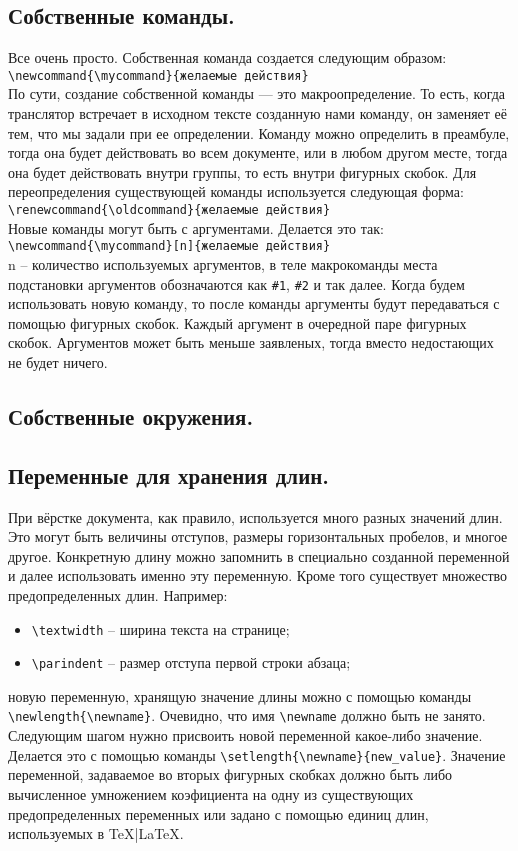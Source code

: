 \subsection{Собственные команды.}
Все очень просто. Собственная команда создается следующим образом:\\
\verb|\newcommand{\mycommand}{желаемые действия}|\\
По сути, создание собственной команды --- это макроопределение. То есть, когда транслятор
встречает в исходном тексте созданную нами команду, он заменяет её тем, что мы задали
при ее определении. Команду можно определить в преамбуле, тогда она будет действовать 
во всем документе, или в любом другом месте, тогда она будет действовать внутри группы, 
то есть внутри фигурных скобок. Для переопределения существующей команды используется
следующая форма:\\
\verb|\renewcommand{\oldcommand}{желаемые действия}|\\
Новые команды могут быть с аргументами. Делается это так:\\
\verb|\newcommand{\mycommand}[n]{желаемые действия}|\\
n -- количество используемых аргументов, в теле макрокоманды места подстановки аргументов
обозначаются как \verb|#1|, \verb|#2| и так далее. Когда будем использовать новую команду,
то после команды аргументы будут передаваться с помощью фигурных скобок. Каждый аргумент
в очередной паре фигурных скобок. Аргументов может быть меньше заявленых, тогда вместо 
недостающих не будет ничего. 

\subsection{Собственные окружения.}
\subsection{Переменные для хранения длин.}
При вёрстке документа, как правило, используется много разных значений длин. Это могут 
быть величины отступов, размеры горизонтальных пробелов, и многое другое. Конкретную 
длину можно запомнить в специально созданной переменной и далее использовать именно эту
переменную. Кроме того существует множество предопределенных длин. Например:
\begin{itemize}
	\item \verb|\textwidth| -- ширина текста на странице;
	\item \verb|\parindent| -- размер отступа первой строки абзаца;
\end{itemize}
{ новую переменную, хранящую значение длины можно с помощью команды 
\verb|\newlength{\newname}|. Очевидно, что имя \verb|\newname| должно быть не занято. 
Следующим шагом нужно присвоить новой переменной какое-либо значение. Делается это с 
помощью команды \verb|\setlength{\newname}{new_value}|. Значение переменной, задаваемое 
во вторых фигурных скобках должно быть либо вычисленное умножением коэфициента на одну
из существующих предопределенных переменных или задано с помощью единиц длин, 
используемых в \TeX|\LaTeX.

}
